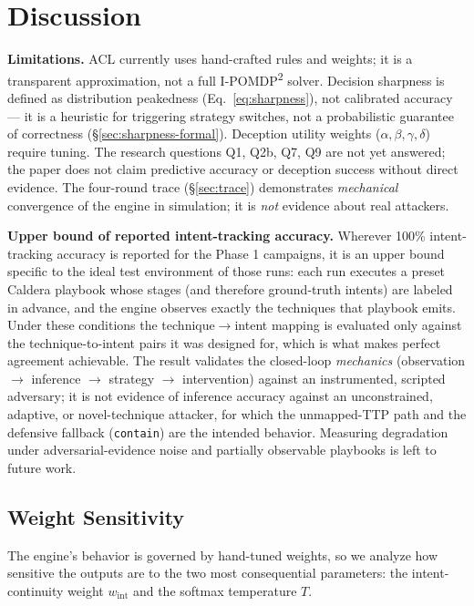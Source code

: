 \documentclass[11pt]{article}
\newcommand{\act}[1]{\texttt{#1}}
\begin{document}
\section{Discussion}
\label{sec:discussion}

\textbf{Limitations.} ACL currently uses hand-crafted rules and weights; it
is a transparent approximation, not a full I-POMDP\textsuperscript{2}
solver. Decision sharpness is defined as distribution peakedness
(Eq.~\ref{eq:sharpness}), not calibrated accuracy --- it is a heuristic for
triggering strategy switches, not a probabilistic guarantee of correctness
(\S\ref{sec:sharpness-formal}). Deception utility weights
($\alpha,\beta,\gamma,\delta$) require tuning. The research questions Q1,
Q2b, Q7, Q9 are not yet answered; the paper does not claim predictive
accuracy or deception success without direct evidence. The four-round trace
(\S\ref{sec:trace}) demonstrates \textit{mechanical} convergence of the
engine in simulation; it is \textit{not} evidence about real attackers.

\textbf{Upper bound of reported intent-tracking accuracy.} Wherever
100\% intent-tracking accuracy is reported for the Phase 1 campaigns, it is
an upper bound specific to the ideal test environment of those runs: each
run executes a preset Caldera playbook whose stages (and therefore
ground-truth intents) are labeled in advance, and the engine observes
exactly the techniques that playbook emits. Under these conditions the
technique$\to$intent mapping is evaluated only against the technique-to-intent
pairs it was designed for, which is what makes perfect agreement
achievable. The result validates the closed-loop \textit{mechanics}
(observation $\to$ inference $\to$ strategy $\to$ intervention) against an
instrumented, scripted adversary; it is not evidence of inference accuracy
against an unconstrained, adaptive, or novel-technique attacker, for which
the unmapped-TTP path and the defensive fallback (\act{contain}) are the
intended behavior. Measuring degradation under adversarial-evidence noise
and partially observable playbooks is left to future work.

\subsection{Weight Sensitivity}
\label{sec:sensitivity}

The engine's behavior is governed by hand-tuned weights, so we analyze how
sensitive the outputs are to the two most consequential parameters: the
intent-continuity weight $w_{\mathrm{int}}$ and the softmax temperature $T$.
\end{document}
